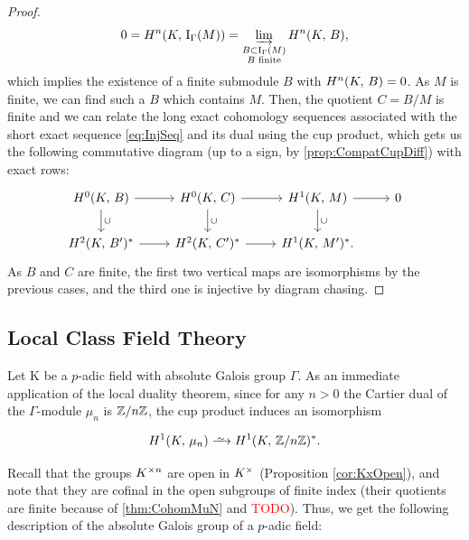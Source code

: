 \documentclass[a4paper, oneside]{memoir}
\begin{document}
\begin{proof}
    \[
        0=H^{n}( K, \, \mathrm{I}_{\Gamma}(M) )=\varinjlim_{\substack{B\subset\mathrm{I}_{\Gamma}(M) \\B\text{ finite}}}{H^{n}( K, \, B )},
    \]
    which implies the existence of a finite submodule \(B\) with \(H^{n}( K, \, B )=0\). As \(M\) is finite, we can find such a \(B\) which contains \(M\). Then, the quotient \(C=B/M\) is finite and we can relate the long exact cohomology sequences associated with the short exact sequence \eqref{eq:InjSeq}
    and its dual using the cup product, which gets us the following commutative diagram (up to a sign, by \ref{prop:CompatCupDiff}) with exact rows:
    \[
        \begin{tikzcd}
            \H{0}{\K}{B} \ar[r] \ar[d, "\cup"] & \H{0}{\K}{C} \ar[r] \ar[d, "\cup"] & \H{1}{\K}{M} \ar[d, "\cup"] \ar[r] & 0 \\
            \H{2}{\K}{B^\prime}^* \ar[r] & \H{2}{\K}{C^\prime}^* \ar[r] & \H{1}{\K}{M^\prime}^*.
        \end{tikzcd}
    \]
    As \(B\) and \(C\) are finite, the first two vertical maps are isomorphisms by the previous cases, and the third one is injective by diagram chasing.

\end{proof}


\subsection{Local Class Field Theory}

Let K be a $p$-adic field with absolute Galois group $\Gamma$. As an immediate application of the local duality theorem, since for any $n>0$ the Cartier dual of the $\Gamma$-module $\mu_n$ is $\mathbb{Z}/n\mathbb{Z}$, the cup product induces an isomorphism


\[
    \H{1}{K}{\mu_n} \Iso \H{1}{K}{\Zn}^*.
\]

Recall that the groups $K^{\times n}$ are open in $K^\times$ (Proposition \ref{cor:KxOpen}), and note that they are cofinal in the open subgroups of finite index (their quotients are
finite because of \ref{thm:CohomMuN} and \textcolor{red}{TODO}). Thus, we get the following description of the absolute Galois group of a $p$-adic field:
\end{document}
